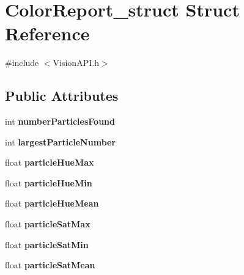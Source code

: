 \hypertarget{structColorReport__struct}{
\section{ColorReport\_\-struct Struct Reference}
\label{structColorReport__struct}
}


{\ttfamily \#include $<$VisionAPI.h$>$}

\subsection*{Public Attributes}
\begin{DoxyCompactItemize}
\item 
\hypertarget{structColorReport__struct_aad77f6927e3f39f6526c2c4eaf576f77}{
int {\bfseries numberParticlesFound}}
\label{structColorReport__struct_aad77f6927e3f39f6526c2c4eaf576f77}

\item 
\hypertarget{structColorReport__struct_a61c7e148e86f48ba30d49b618a44f5b7}{
int {\bfseries largestParticleNumber}}
\label{structColorReport__struct_a61c7e148e86f48ba30d49b618a44f5b7}

\item 
\hypertarget{structColorReport__struct_a8e0f5bf5c5fd84e8a5a12ab05c8ec7a0}{
float {\bfseries particleHueMax}}
\label{structColorReport__struct_a8e0f5bf5c5fd84e8a5a12ab05c8ec7a0}

\item 
\hypertarget{structColorReport__struct_a827166971971b8065e0a973b665d4e7d}{
float {\bfseries particleHueMin}}
\label{structColorReport__struct_a827166971971b8065e0a973b665d4e7d}

\item 
\hypertarget{structColorReport__struct_a6393b86e9ee0c147c5a352f102bed6b6}{
float {\bfseries particleHueMean}}
\label{structColorReport__struct_a6393b86e9ee0c147c5a352f102bed6b6}

\item 
\hypertarget{structColorReport__struct_ab06216cbb57a7d5fba9fdddafa5151d2}{
float {\bfseries particleSatMax}}
\label{structColorReport__struct_ab06216cbb57a7d5fba9fdddafa5151d2}

\item 
\hypertarget{structColorReport__struct_a0da060362914d04a878f1d710560222d}{
float {\bfseries particleSatMin}}
\label{structColorReport__struct_a0da060362914d04a878f1d710560222d}

\item 
\hypertarget{structColorReport__struct_a0b870a88971466d469f8540af24a51ac}{
float {\bfseries particleSatMean}}
\label{structColorReport__struct_a0b870a88971466d469f8540af24a51ac}


\end{DoxyCompactItemize}
